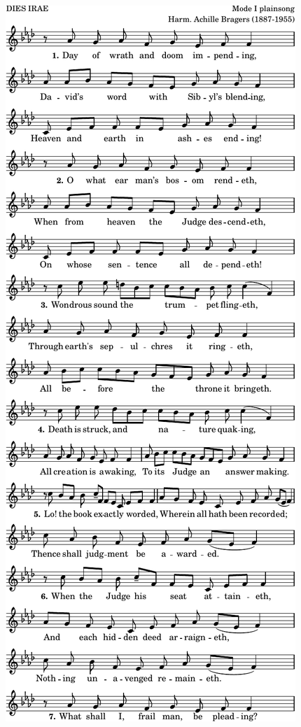 \includegraphics{Day of wrath (DIES IRAE)-Melody-1}%
\ifx\betweenLilyPondSystem \undefined
  \linebreak
\else
  \expandafter{}%
\fi
